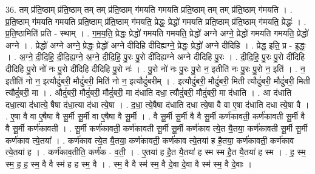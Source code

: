 \documentclass[17pt]{extarticle}
\begin{document}
36. तम् प्र॑ति॒ष्ठाम् प्र॑ति॒ष्ठाम् तम् तम् प्र॑ति॒ष्ठाम् ग॑मयति गमयति प्रति॒ष्ठाम् तम् तम् प्र॑ति॒ष्ठाम् ग॑मयति । . प्र॒ति॒ष्ठाम् ग॑मयति गमयति प्रति॒ष्ठाम् प्र॑ति॒ष्ठाम् ग॑मयति॒ प्रेद्धः॒ प्रेद्धो॑ गमयति प्रति॒ष्ठाम् प्र॑ति॒ष्ठाम् ग॑मयति॒ प्रेद्धः॑ । . प्र॒ति॒ष्ठामिति॑ प्रति - स्थाम् । . ग॒म॒य॒ति॒ प्रेद्धः॒ प्रेद्धो॑ गमयति गमयति॒ प्रेद्धो॑ अग्ने अग्ने॒ प्रेद्धो॑ गमयति गमयति॒ प्रेद्धो॑ अग्ने । . प्रेद्धो॑ अग्ने अग्ने॒ प्रेद्धः॒ प्रेद्धो॑ अग्ने दीदिहि दीदिह्यग्ने॒ प्रेद्धः॒ प्रेद्धो॑ अग्ने दीदिहि । . प्रेद्ध॒ इति॒ प्र - इ॒द्धः॒ । . अ॒ग्ने॒ दी॒दि॒हि॒ दी॒दि॒ह्य॒ग्ने॒ अ॒ग्ने॒ दी॒दि॒हि॒ पु॒रः पु॒रो दी॑दिह्यग्ने अग्ने दीदिहि पु॒रः । . दी॒दि॒हि॒ पु॒रः पु॒रो दी॑दिहि दीदिहि पु॒रो नो॑ नः पु॒रो दी॑दिहि दीदिहि पु॒रो नः॑ । . पु॒रो नो॑ नः पु॒रः पु॒रो न॒ इतीति॑ नः पु॒रः पु॒रो न॒ इति॑ । . न॒ इतीति॑ नो न॒ इत्यौदुं॑बरी॒ मौदुं॑बरी॒ मिति॑ नो न॒ इत्यौदुं॑बरीम् । . इत्यौदुं॑बरी॒ मौदुं॑बरी॒ मिती त्यौदुं॑बरी॒ मौदुं॑बरी॒ मिती त्यौदुं॑बरी॒ मा । . औदुं॑बरी॒ मौदुं॑बरी॒ मौदुं॑बरी॒ मा द॑धाति दधा॒ त्यौदुं॑बरी॒ मौदुं॑बरी॒ मा द॑धाति । . आ द॑धाति दधा॒त्या द॑धात्ये॒ षैषा द॑धा॒त्या द॑धा त्ये॒षा । . द॒धा॒ त्ये॒षैषा द॑धाति दधा त्ये॒षा वै वा ए॒षा द॑धाति दधा त्ये॒षा वै । . ए॒षा वै वा ए॒षैषा वै सू॒र्मी सू॒र्मी वा ए॒षैषा वै सू॒र्मी । . वै सू॒र्मी सू॒र्मी वै वै सू॒र्मी कर्ण॑कावती॒ कर्ण॑कावती सू॒र्मी वै वै सू॒र्मी कर्ण॑कावती । . सू॒र्मी कर्ण॑कावती॒ कर्ण॑कावती सू॒र्मी सू॒र्मी कर्ण॑काव त्ये॒त यै॒तया॒ कर्ण॑कावती सू॒र्मी सू॒र्मी कर्ण॑काव त्ये॒तया᳚ । . कर्ण॑काव त्ये॒त यै॒तया॒ कर्ण॑कावती॒ कर्ण॑काव त्ये॒तया॑ ह है॒तया॒ कर्ण॑कावती॒ कर्ण॑काव त्ये॒तया॑ ह । . कर्ण॑काव॒तीति॒ कर्ण॑क - व॒ती॒ । . ए॒तया॑ ह है॒त यै॒तया॑ ह स्म स्म है॒त यै॒तया॑ ह स्म । . ह॒ स्म॒ स्म॒ ह॒ ह॒ स्म॒ वै वै स्म॑ ह ह स्म॒ वै । . स्म॒ वै वै स्म॑ स्म॒ वै दे॒वा दे॒वा वै स्म॑ स्म॒ वै दे॒वाः । \newline
\pagebreak
{}
\end{document}
